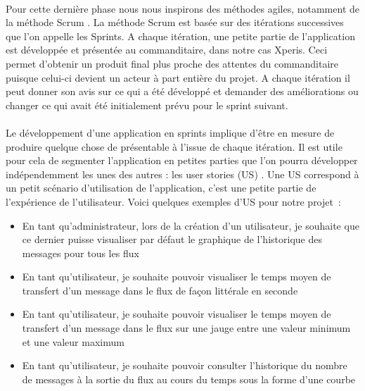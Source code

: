 			\paragraph{}%
			Pour cette dernière phase nous nous inspirons des méthodes agiles, notamment
			de la méthode Scrum \citep{aubry_scrum_2015}. La méthode Scrum est basée sur
			des itérations successives que l'on appelle les Sprints. A chaque itération, une petite
			partie de l'application est développée et présentée au commanditaire, dans
			notre cas Xperis.
			Ceci permet d'obtenir un produit final plus proche des attentes
			du commanditaire puisque celui-ci devient un acteur à part entière du
			projet. A chaque itération il peut donner son avis sur ce qui a été
			développé et demander des améliorations ou changer ce qui avait été
			initialement prévu pour le sprint suivant.
			
			\paragraph{}%
			Le développement d'une application en sprints implique d'être en mesure de
			produire quelque chose de présentable à l'issue de chaque itération.
			Il est utile pour cela de segmenter l'application en petites parties que
			l'on pourra développer indépendemment les unes des autres : les user stories
			(US) \citep{aubry_scrum_2015}.
			Une US correspond à un petit scénario d'utilisation de
			l'application, c'est une petite partie de l'expérience de l'utilisateur.
			Voici quelques exemples d'US pour notre projet~:
			\begin{itemize}
			  \item En tant qu'administrateur, lors de la création d'un utilisateur, je
			  souhaite que ce dernier puisse visualiser par défaut le graphique de
			  l'historique des messages pour tous les flux
			  \item En tant qu'utilisateur, je souhaite pouvoir visualiser le temps moyen
			  de transfert d'un message dans le flux de façon littérale en seconde
			  \item En tant qu'utilisateur, je souhaite pouvoir visualiser le temps
			  moyen de transfert d'un message dans le flux sur une jauge entre une
			  valeur minimum et une valeur maximum
			  \item En tant qu'utilisateur, je souhaite pouvoir consulter l'historique du
			  nombre de messages à la sortie du flux au cours du temps sous la forme
			  d'une courbe
			\end{itemize}
			
